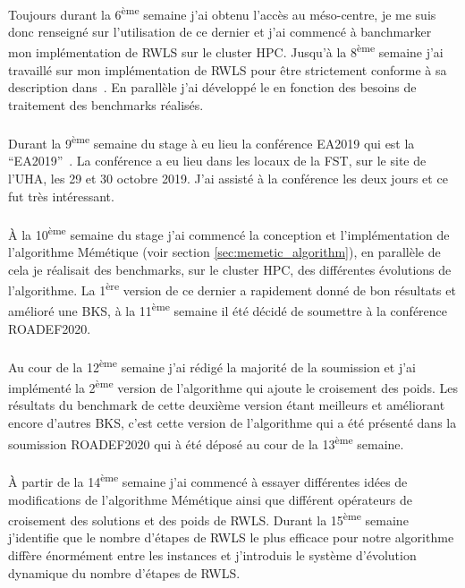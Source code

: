 \documentclass[a4paper,11pt,twoside,french,report]{../common/simplem}
\begin{document}
				\paragraph*{}
					Toujours durant la 6\textsuperscript{ème} semaine j'ai obtenu l'accès au méso-centre, je me suis donc renseigné sur l'utilisation de ce dernier et j'ai commencé à banchmarker mon implémentation de \gls{RWLS} sur le cluster \gls{HPC}. Jusqu’à la 8\textsuperscript{ème} semaine j'ai travaillé sur mon implémentation de \gls{RWLS} pour être strictement conforme à sa description dans~\cite{Gao2015}. En parallèle j'ai développé le \printer{} en fonction des besoins de traitement des benchmarks réalisés.
				\paragraph*{}
					Durant la 9\textsuperscript{ème} semaine du stage à eu lieu la conférence \acrshort{EA2019} qui est la ``\acrlong{EA2019}''~\cite{EA2019}. La conférence a eu lieu dans les locaux de la \gls{FST}, sur le site de l'\gls{UHA}, les 29 et 30 octobre 2019. J'ai assisté à la conférence les deux jours et ce fut très intéressant.
				\paragraph*{}
					À la 10\textsuperscript{ème} semaine du stage j'ai commencé la conception et l'implémentation de l'algorithme Mémétique (voir section \ref{sec:memetic_algorithm}), en parallèle de cela je réalisait des benchmarks, sur le cluster \gls{HPC}, des différentes évolutions de l'algorithme. La 1\textsuperscript{ère} version de ce dernier a rapidement donné de bon résultats et amélioré une \gls{BKS}, à la 11\textsuperscript{ème} semaine il été décidé de soumettre à la conférence \acrshort{ROADEF2020}.
				\paragraph*{}
					Au cour de la 12\textsuperscript{ème} semaine j'ai rédigé la majorité de la soumission et j'ai implémenté la 2\textsuperscript{ème} version de l'algorithme qui ajoute le croisement des poids. Les résultats du benchmark de cette deuxième version étant meilleurs et améliorant encore d'autres \gls{BKS}, c'est cette version de l'algorithme qui a été présenté dans la soumission \acrshort{ROADEF2020} qui à été déposé au cour de la 13\textsuperscript{ème} semaine.
				\paragraph*{}
					À partir de la 14\textsuperscript{ème} semaine j'ai commencé à essayer différentes idées de modifications de l'algorithme Mémétique ainsi que différent opérateurs de croisement des solutions et des poids de \gls{RWLS}. Durant la 15\textsuperscript{ème} semaine j'identifie que le nombre d'étapes de \gls{RWLS} le plus efficace pour notre algorithme diffère énormément entre les instances et j’introduis le système d'évolution dynamique du nombre d'étapes de \gls{RWLS}.
\end{document}
